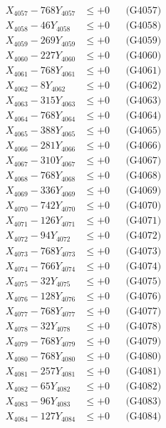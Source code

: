 \documentclass[a4paper,10pt]{article}
\begin{document}
{\begin{align}
X_{4057} - 768Y_{4057} &\leq +0 && \text{(G4057)} \\
X_{4058} - 46Y_{4058} &\leq +0 && \text{(G4058)} \\
X_{4059} - 269Y_{4059} &\leq +0 && \text{(G4059)} \\
X_{4060} - 227Y_{4060} &\leq +0 && \text{(G4060)} \\
\allowbreak
X_{4061} - 768Y_{4061} &\leq +0 && \text{(G4061)} \\
X_{4062} - 8Y_{4062} &\leq +0 && \text{(G4062)} \\
X_{4063} - 315Y_{4063} &\leq +0 && \text{(G4063)} \\
X_{4064} - 768Y_{4064} &\leq +0 && \text{(G4064)} \\
X_{4065} - 388Y_{4065} &\leq +0 && \text{(G4065)} \\
X_{4066} - 281Y_{4066} &\leq +0 && \text{(G4066)} \\
X_{4067} - 310Y_{4067} &\leq +0 && \text{(G4067)} \\
X_{4068} - 768Y_{4068} &\leq +0 && \text{(G4068)} \\
X_{4069} - 336Y_{4069} &\leq +0 && \text{(G4069)} \\
X_{4070} - 742Y_{4070} &\leq +0 && \text{(G4070)} \\
\allowbreak
X_{4071} - 126Y_{4071} &\leq +0 && \text{(G4071)} \\
X_{4072} - 94Y_{4072} &\leq +0 && \text{(G4072)} \\
X_{4073} - 768Y_{4073} &\leq +0 && \text{(G4073)} \\
X_{4074} - 766Y_{4074} &\leq +0 && \text{(G4074)} \\
X_{4075} - 32Y_{4075} &\leq +0 && \text{(G4075)} \\
X_{4076} - 128Y_{4076} &\leq +0 && \text{(G4076)} \\
X_{4077} - 768Y_{4077} &\leq +0 && \text{(G4077)} \\
X_{4078} - 32Y_{4078} &\leq +0 && \text{(G4078)} \\
X_{4079} - 768Y_{4079} &\leq +0 && \text{(G4079)} \\
X_{4080} - 768Y_{4080} &\leq +0 && \text{(G4080)} \\
\allowbreak
X_{4081} - 257Y_{4081} &\leq +0 && \text{(G4081)} \\
X_{4082} - 65Y_{4082} &\leq +0 && \text{(G4082)} \\
X_{4083} - 96Y_{4083} &\leq +0 && \text{(G4083)} \\
X_{4084} - 127Y_{4084} &\leq +0 && \text{(G4084)} \\

\end{align}}
\end{document}
